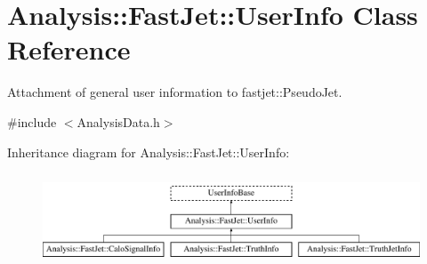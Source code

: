 \hypertarget{classAnalysis_1_1FastJet_1_1UserInfo}{}\section{Analysis\+:\+:Fast\+Jet\+:\+:User\+Info Class Reference}
\label{classAnalysis_1_1FastJet_1_1UserInfo}


Attachment of general user information to {\ttfamily fastjet\+::\+Pseudo\+Jet}.  




{\ttfamily \#include $<$Analysis\+Data.\+h$>$}

Inheritance diagram for Analysis\+:\+:Fast\+Jet\+:\+:User\+Info\+:\begin{figure}[H]
\begin{center}
\leavevmode
\includegraphics[height=2.758621cm]{classAnalysis_1_1FastJet_1_1UserInfo}
\end{center}
\end{figure}
